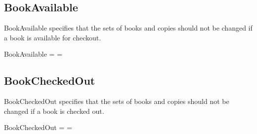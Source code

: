 \documentclass{article}
\begin{document}
\subsection{BookAvailable}
 BookAvailable specifies that the sets of books and copies should not be changed if a book is available for checkout.
\begin{schema}{BookAvailable}
 = 
 = 
\end{schema}

\subsection{BookCheckedOut}
BookCheckedOut specifies that the sets of books and copies should not be changed if a book is checked out.
\begin{schema}{BookCheckedOut}
 = 
 = 
\end{schema}
\end{document}
